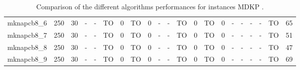\begin{sidewaystable}[!ht]
{\begin{tabular}{lcccccccccccccccccccc}
mknapcb8\_6 & 250 & 30 &  - &  - & TO & 0 & TO & 0 &  - &  - & TO & 0 & TO & 0 &  - &  - &  - &  - & TO & 65 \\
mknapcb8\_7 & 250 & 30 &  - &  - & TO & 0 & TO & 0 &  - &  - & TO & 0 & TO & 0 &  - &  - &  - &  - & TO & 51 \\
mknapcb8\_8 & 250 & 30 &  - &  - & TO & 0 & TO & 0 &  - &  - & TO & 0 & TO & 0 &  - &  - &  - &  - & TO & 47 \\
mknapcb8\_9 & 250 & 30 &  - &  - & TO & 0 & TO & 0 &  - &  - & TO & 0 & TO & 0 &  - &  - &  - &  - & TO & 69 \\
\bottomrule
\end{tabular}
}%
\caption{Comparison of the different algorithms performances for instances MDKP .}
\label{tab:table_compare_MDKP }
\end{sidewaystable}
